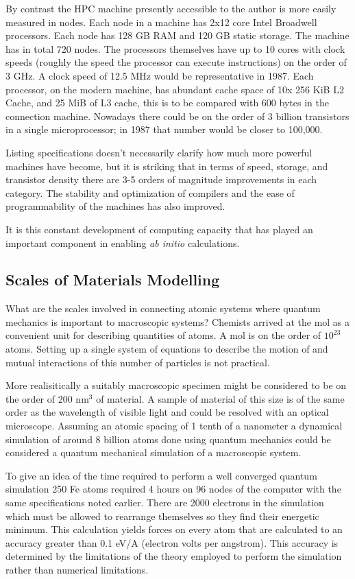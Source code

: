By contrast the HPC machine presently accessible to the author 
is more easily measured in nodes. Each node in a machine has 2x12 core Intel Broadwell processors.
Each node has 128 GB RAM and 120 GB static storage. The machine has in total 720 nodes. 
The processors themselves have up to 10 cores with clock speeds (roughly the speed the
processor can execute instructions) on the order of 3 GHz. A clock speed of 12.5 MHz 
would be representative in 1987. 
Each processor, on the modern machine, has abundant cache space of 10x 256 KiB L2 Cache, and 25 MiB of L3 cache,
this is to be compared with 600 bytes in the connection machine. 
Nowadays there could be on the order of 3 billion transistors in a single microprocessor;
in 1987 that number would be closer to 100,000. 

Listing specifications doesn't necessarily clarify how much more powerful machines have become, 
but it is striking that in terms of speed, storage, and transistor density 
there are 3-5 orders of magnitude improvements in each category. 
The stability and optimization of compilers and the ease of programmability
of the machines has also improved.

It is this constant development of computing capacity that 
has played an important component in enabling {\it ab initio} calculations. 

\subsection{Scales of Materials Modelling}
What are the scales involved in connecting atomic systems where quantum mechanics is important
to macroscopic systems? Chemists arrived at the mol as a convenient unit for describing
quantities of atoms. A mol is on the order of $10^{23}$ atoms. Setting up a single 
system of equations to describe the motion of and mutual interactions of 
this number of particles is not practical.

More realisitically a suitably macroscopic specimen might be considered to be on the 
order of 200 nm$^{3}$ of material. A sample of material of this size is of the 
same order as the wavelength of visible light and could be
resolved with an optical microscope. Assuming an atomic spacing of 1 tenth of a nanometer 
a dynamical simulation of around 8 billion atoms done using quantum mechanics 
could be considered a quantum mechanical simulation of a macroscopic system. 

To give an idea of the time required to perform a well converged quantum simulation 
250 Fe atoms required 4 hours on 96 nodes of the computer with the same 
specifications noted earlier. There are 2000 electrons in the simulation which must be allowed
to rearrange themselves so they find their energetic minimum. This calculation yields forces on every 
atom that are calculated to an accuracy greater than 0.1 eV/A (electron volts per angstrom).
This accuracy is determined by the limitations of the theory employed to perform the simulation
rather than numerical limitations.

